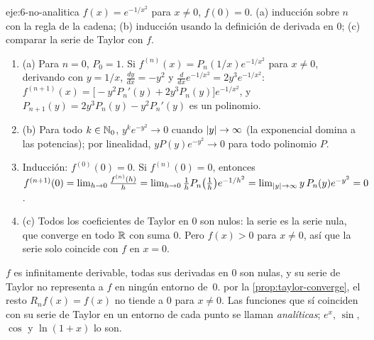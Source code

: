 \begin{solucion}{eje:6-no-analitica}
\datos $f(x)=e^{-1/x^{2}}$ para $x\neq0$, $f(0)=0$.
\planteamiento (a) inducción sobre $n$ con la regla de la cadena; (b) inducción usando la definición de derivada en $0$; (c) comparar la serie de Taylor con $f$.
\pasos
\begin{enumerate}[label=\arabic*.]
  \item (a) Para $n=0$, $P_0=1$. Si $f^{(n)}(x)=P_n(1/x)e^{-1/x^{2}}$ para $x\neq0$, derivando con $y=1/x$, $\frac{dy}{dx}=-y^{2}$ y $\frac{d}{dx}e^{-1/x^{2}}=2y^{3}e^{-1/x^{2}}$: $f^{(n+1)}(x)=\bigl[-y^{2}P_n'(y)+2y^{3}P_n(y)\bigr]e^{-1/x^{2}}$, y $P_{n+1}(y)=2y^{3}P_n(y)-y^{2}P_n'(y)$ es un polinomio.
  \item (b) Para todo $k\in\mathbb{N}_0$, $y^{k}e^{-y^{2}}\to0$ cuando $\lvert y\rvert\to\infty$ (la exponencial domina a las potencias); por linealidad, $yP(y)e^{-y^{2}}\to0$ para todo polinomio $P$.
  \item Inducción: $f^{(0)}(0)=0$. Si $f^{(n)}(0)=0$, entonces $f^{(n+1)}(0)=\lim_{h\to0}\frac{f^{(n)}(h)}{h}=\lim_{h\to0}\frac1hP_n\bigl(\tfrac1h\bigr)e^{-1/h^{2}}=\lim_{\lvert y\rvert\to\infty}y\,P_n(y)e^{-y^{2}}=0$.
  \item (c) Todos los coeficientes de Taylor en $0$ son nulos: la serie es la serie nula, que converge en todo $\mathbb{R}$ con suma $0$. Pero $f(x)>0$ para $x\neq0$, así que la serie solo coincide con $f$ en $x=0$.
\end{enumerate}
\resultado $f$ es infinitamente derivable, todas sus derivadas en $0$ son nulas, y su serie de Taylor no representa a $f$ en ningún entorno de~$0$.
\comprobacion por la \cref{prop:taylor-converge}, el resto $R_nf(x)=f(x)$ no tiende a $0$ para $x\neq0$. Las funciones que sí coinciden con su serie de Taylor en un entorno de cada punto se llaman \emph{analíticas}; $e^{x}$, $\sin$, $\cos$ y $\ln(1+x)$ lo son.
\end{solucion}
